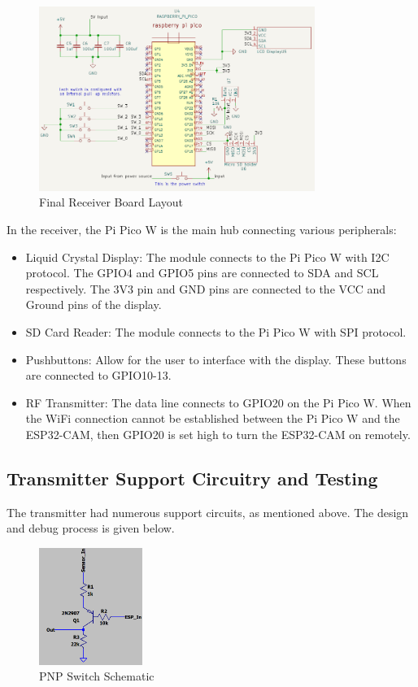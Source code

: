 \begin{figure}[h]
\centering
\includegraphics[width=0.8\textwidth]{Images/Receiver_layout.png}
\caption{Final Receiver Board Layout}
\label{fig:my_label}
\end{figure}

In the receiver, the Pi Pico W is the main hub connecting various peripherals:
\begin{itemize}
    \item Liquid Crystal Display: The module connects to the Pi Pico W with I2C protocol. The GPIO4 and GPIO5 pins are connected to SDA and SCL respectively. The 3V3 pin and GND pins are connected to the VCC and Ground pins of the display. 
    \item SD Card Reader: The module connects to the Pi Pico W with SPI protocol. 
    \item Pushbuttons: Allow for the user to interface with the display. These buttons are connected to GPIO10-13. 
    \item RF Transmitter: The data line connects to GPIO20 on the Pi Pico W. When the WiFi connection cannot be established between the Pi Pico W and the ESP32-CAM, then GPIO20 is set high to turn the ESP32-CAM on remotely. 
\end{itemize}



\subsection{Transmitter Support Circuitry and Testing}
The transmitter had numerous support circuits, as mentioned above. The design and debug process is given below. 

\begin{figure}[h]
\centering
\includegraphics[width=0.3\textwidth]{Images/Switch_circuit.png}
\caption{PNP Switch Schematic}
\label{fig:my_label}
\end{figure}

